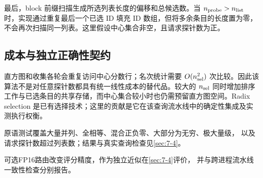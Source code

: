 最后，block 前缀扫描生成所选列表长度的偏移和总候选数。当 $n_{\rm probe}>n_{\rm list}$ 时，实现通过重复最后一个已选 ID 填充 ID 数组，但将多余条目的长度置为零，不会再次扫描同一列表。这里假设中心集合非空，且请求探针数为正。

\subsection{成本与独立正确性契约}

直方图和收集各轮会重复访问中心分数行；名次统计需要 $O(n_{\rm sel}^2)$ 次比较。因此该算法不是对任意探针数都具有统一线性成本的替代品。较大的 $n_{\rm sel}$ 同时增加排序工作与已选条目的共享存储，而中心集合较小时也仍需预留直方图空间。Radix selection 是已有选择技术；这里的贡献是它在该查询流水线中的确定性集成及实测执行权衡。



原语测试覆盖大量并列、全相等、混合正负零、大部分为无穷、极大量级，
以及请求探针数超过列表数；结果与真实查询检查见\cref{sec:7-4}。


可选FP16路由改变评分精度，作为独立近似在\cref{sec:7-4}评价，
并与跨进程流水线一致性检查分别报告。
